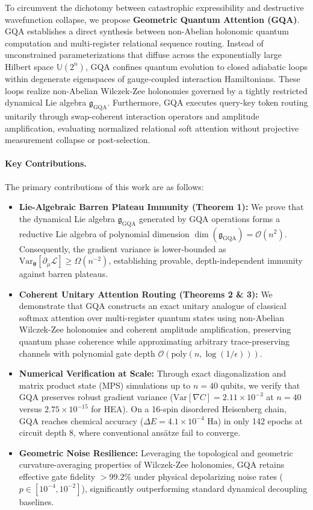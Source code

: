 \documentclass{article}
\begin{document}
To circumvent the dichotomy between catastrophic expressibility and destructive wavefunction collapse, we propose \textbf{Geometric Quantum Attention (GQA)}. GQA establishes a direct synthesis between non-Abelian holonomic quantum computation \citep{Feng2013ExperimentalRealization} and multi-register relational sequence routing. Instead of unconstrained parameterizations that diffuse across the exponentially large Hilbert space $\mathbb{U}(2^n)$, GQA confines quantum evolution to closed adiabatic loops within degenerate eigenspaces of gauge-coupled interaction Hamiltonians. These loops realize non-Abelian Wilczek-Zee holonomies governed by a tightly restricted dynamical Lie algebra $\mathfrak{g}_{\mathrm{GQA}}$. Furthermore, GQA executes query-key token routing unitarily through swap-coherent interaction operators and amplitude amplification, evaluating normalized relational soft attention without projective measurement collapse or post-selection.

\paragraph{Key Contributions.} The primary contributions of this work are as follows:
\begin{itemize}
    \item \textbf{Lie-Algebraic Barren Plateau Immunity (Theorem 1):} We prove that the dynamical Lie algebra $\mathfrak{g}_{\mathrm{GQA}}$ generated by GQA operations forms a reductive Lie algebra of polynomial dimension $\dim(\mathfrak{g}_{\mathrm{GQA}}) = \mathcal{O}(n^2)$. Consequently, the gradient variance is lower-bounded as $\mathrm{Var}_{\boldsymbol{\theta}}[\partial_\mu \mathcal{L}] \ge \Omega(n^{-2})$, establishing provable, depth-independent immunity against barren plateaus.
    \item \textbf{Coherent Unitary Attention Routing (Theorems 2 \& 3):} We demonstrate that GQA constructs an exact unitary analogue of classical softmax attention over multi-register quantum states using non-Abelian Wilczek-Zee holonomies and coherent amplitude amplification, preserving quantum phase coherence while approximating arbitrary trace-preserving channels with polynomial gate depth $\mathcal{O}(\mathrm{poly}(n, \log(1/\epsilon)))$.
    \item \textbf{Numerical Verification at Scale:} Through exact diagonalization and matrix product state (MPS) simulations up to $n=40$ qubits, we verify that GQA preserves robust gradient variance ($\mathrm{Var}[\nabla C] = 2.11 \times 10^{-3}$ at $n=40$ versus $2.75 \times 10^{-15}$ for HEA). On a 16-spin disordered Heisenberg chain, GQA reaches chemical accuracy ($\Delta E = 4.1 \times 10^{-4}\text{ Ha}$) in only 142 epochs at circuit depth 8, where conventional ans\"atze fail to converge.
    \item \textbf{Geometric Noise Resilience:} Leveraging the topological and geometric curvature-averaging properties of Wilczek-Zee holonomies, GQA retains effective gate fidelity $>99.2\%$ under physical depolarizing noise rates ($p \in [10^{-4}, 10^{-2}]$), significantly outperforming standard dynamical decoupling baselines.
\end{itemize}
\end{document}
